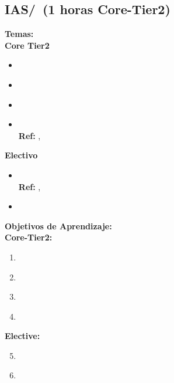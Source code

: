 \subsection{IAS/\IASThreatsandAttacks~(1 horas Core-Tier2)}\label{sec:BOK:IASThreatsandAttacks}
\noindent \textbf{Temas:}\\
\noindent \textbf{Core Tier2}
\begin{itemize}
	\item \IASThreatsandAttacksTopicAttacker\label{sec:BOK:IASThreatsandAttacksTopicAttacker}
	\item \IASThreatsandAttacksTopicExamples\label{sec:BOK:IASThreatsandAttacksTopicExamples}
	\item \IASThreatsandAttacksTopicDenial\label{sec:BOK:IASThreatsandAttacksTopicDenial}
	\item \IASThreatsandAttacksTopicSocial\xspace \\ \textbf{Ref:} , \label{sec:BOK:IASThreatsandAttacksTopicSocial}
\end{itemize}

\noindent \textbf{Electivo}
\begin{itemize}
	\item \IASThreatsandAttacksTopicAttacks\xspace \\ \textbf{Ref:} , \label{sec:BOK:IASThreatsandAttacksTopicAttacks}
	\item \IASThreatsandAttacksTopicMalware\label{sec:BOK:IASThreatsandAttacksTopicMalware}
\end{itemize}


\noindent \textbf{Objetivos de Aprendizaje:}\\
\noindent \textbf{Core-Tier2:}
\begin{enumerate}
	\setcounter{enumi}{0}
	\item \IASThreatsandAttacksLODescribeLikely\xspace[\IASThreatsandAttacksLODescribeLikelyLevel]\label{sec:BOK:IASThreatsandAttacksLODescribeLikely}
	\item \IASThreatsandAttacksLODiscussTheMalware\xspace[\IASThreatsandAttacksLODiscussTheMalwareLevel]\label{sec:BOK:IASThreatsandAttacksLODiscussTheMalware}
	\item \IASThreatsandAttacksLOIdentifyInstances\xspace[\IASThreatsandAttacksLOIdentifyInstancesLevel]\label{sec:BOK:IASThreatsandAttacksLOIdentifyInstances}
	\item \IASThreatsandAttacksLODiscussHowService\xspace[\IASThreatsandAttacksLODiscussHowServiceLevel]\label{sec:BOK:IASThreatsandAttacksLODiscussHowService}
\end{enumerate}
\noindent \textbf{Elective:}
\begin{enumerate}
	\setcounter{enumi}{4}
	\item \IASThreatsandAttacksLODescribeRisks\xspace[\IASThreatsandAttacksLODescribeRisksLevel]\label{sec:BOK:IASThreatsandAttacksLODescribeRisks}
	\item \IASThreatsandAttacksLODiscussTheCovert\xspace[\IASThreatsandAttacksLODiscussTheCovertLevel]\label{sec:BOK:IASThreatsandAttacksLODiscussTheCovert}
\end{enumerate}


